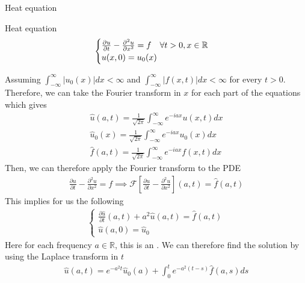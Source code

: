 \begin{parag}{Heat equation}
	\begin{definition}{Heat equation}
    \begin{align*} 
		\begin{cases}
			\frac{\partial u}{\partial t}  - \frac{\partial^2 u}{\partial x^2} = f \mathspace \forall t > 0, x \in \mathbb{R}\\
			u \left(x, 0\right) = u_0\left(x\right)
		\end{cases} 
	\end{align*}
	\end{definition}
	Assuming $\int_{-\infty}^{\infty} \left|u_0\left(x\right)\right|dx < \infty$ and $\int_{-\infty}^{\infty}\left|f\left(x, t\right)\right|dx < \infty$ for every $t > 0$. Therefore, we can take the Fourier transform in $x$ for each part of the equations which gives 
	\begin{align*} 
		\hat{u}\left(a, t\right) = \frac{1}{\sqrt{2\pi}}\int_{-\infty}^{\infty}e^{-iax}u\left(x, t\right)dx\\
		\hat{u}_0\left(x\right) = \frac{1}{\sqrt{2\pi}}\int_{-\infty}^{\infty}e^{-iax}u_0\left(x\right)dx\\
		\hat{f}\left(a, t\right)= \frac{1}{\sqrt{2\pi}}\int_{-\infty}^{\infty}e^{-iax}f\left(x, t\right)dx
	\end{align*}
	Then, we can therefore apply the Fourier transform to the PDE 
	\begin{align*} 
		\frac{\partial u}{\partial t}  - \frac{\partial^2 u}{\partial x^2} = f \implies \mathcal{F}\left[\frac{\partial u}{\partial t}  - \frac{\partial^2 u}{\partial x^2}\right]\left(a, t\right)= \hat{f}\left(a, t\right)
	\end{align*}
	This implies for us the following 
	\begin{align*} 
		\begin{cases}
			\frac{\partial \hat{u}}{\partial t} \left(a, t\right) + a^2 \hat{u}\left(a, t\right) = \hat{f}\left(a, t\right)\\
			\hat{u}\left(a, 0\right) =  \hat{u}_0
		\end{cases} 
	\end{align*}
	Here for each frequency $a \in \mathbb{R}$, this is an . We can therefore find the solution by using the Laplace transform in $t$ 
	\begin{align*} 
		\hat{u}\left(a, t\right) = e^{-a^2t}\hat{u}_0\left(a\right) + \int_{0}^{t}e^{-a^2\left(t-s\right)}\hat{f}\left(a, s\right)ds
	\end{align*}

\end{parag}
